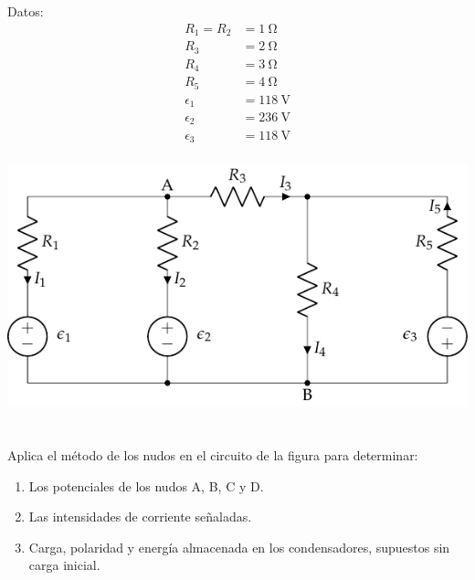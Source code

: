 \documentclass[12pt]{article}
\begin{document}
\begin{minipage}{0.4\linewidth}
  Datos:
  \begin{align*}
    R_1 = R_2 &= \SI{1}{\ohm}\\
    R_3 &= \SI{2}{\ohm}\\
    R_4 &= \SI{3}{\ohm}\\
    R_5 &= \SI{4}{\ohm}\\
    \epsilon_1 &= \SI{118}{\volt}\\
    \epsilon_2 &= \SI{236}{\volt}\\
    \epsilon_3 &= \SI{118}{\volt}\\
  \end{align*}
\end{minipage}
\begin{minipage}{0.6\linewidth}
  \includegraphics{figs/mallas2.pdf}
\end{minipage}

\section{}
Aplica el método de los nudos en el circuito de la figura para determinar:
\begin{enumerate}
\item Los potenciales de los nudos A, B, C y D.
\item Las intensidades de corriente señaladas.
\item Carga, polaridad y energía almacenada en los condensadores,
  supuestos sin carga inicial.
\end{enumerate}
\end{document}
